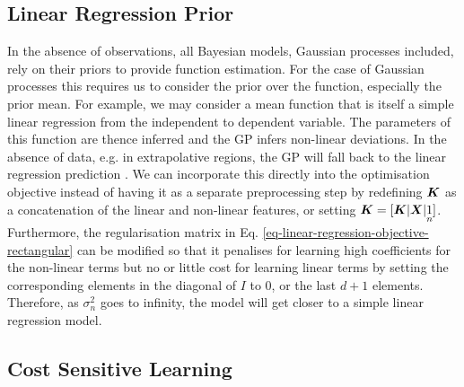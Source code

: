 \documentclass[useAMS,usenatbib,fleqn]{mn2e}
\begin{document}
\subsection{Linear Regression Prior}

In the absence of observations, all Bayesian models, Gaussian processes included, rely on their priors to provide function estimation. For the case of Gaussian processes this requires us to consider the prior over the function, especially the prior mean. For example, we may consider a mean function that is itself a simple linear regression from the independent to dependent variable. The parameters of this function are thence inferred and the GP infers non-linear deviations. In the absence of data, e.g. in extrapolative regions, the GP will fall back to the linear regression prediction \citep{roberts2012rs}. We can incorporate this directly into the optimisation objective instead of having it as a separate preprocessing step by redefining $\bmath{K}$ as a concatenation of the linear and non-linear features, or setting $\bmath{K}=[\bmath{K}|\bmath{X}|\underset{n}{1}]$. Furthermore, the regularisation matrix in Eq. \eqref{eq-linear-regression-objective-rectangular} can be modified so that it penalises for learning high coefficients for the non-linear terms but no or little cost for learning linear terms by setting the corresponding elements in the diagonal of $I$ to 0, or the last $d+1$ elements. Therefore, as $\sigma_{n}^{2}$ goes to infinity, the model will get closer to a simple linear regression model.

\subsection{Cost Sensitive Learning}
\end{document}
